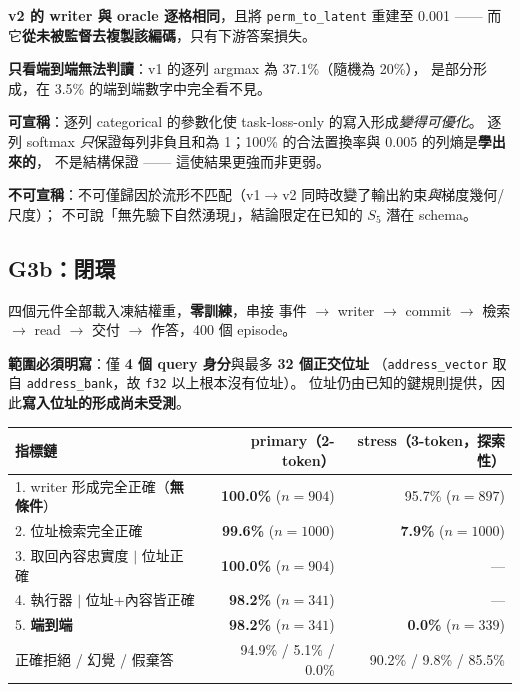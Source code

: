 \documentclass[11pt, a4paper]{article}
\begin{document}
\textbf{v2 的 writer 與 oracle 逐格相同}，且將 \verb|perm_to_latent| 重建至 0.001 ——
而它\textbf{從未被監督去複製該編碼}，只有下游答案損失。

\textbf{只看端到端無法判讀}：v1 的逐列 argmax 為 37.1\%（隨機為 20\%），
是部分形成，在 3.5\% 的端到端數字中完全看不見。

\textbf{可宣稱}：逐列 categorical 的參數化使 task-loss-only 的寫入形成\emph{變得可優化}。
逐列 softmax \emph{只}保證每列非負且和為 1；100\% 的合法置換率與 0.005 的列熵是\textbf{學出來的}，
不是結構保證 —— 這使結果更強而非更弱。

\textbf{不可宣稱}：不可僅歸因於流形不匹配（v1$\to$v2 同時改變了輸出約束\emph{與}梯度幾何/尺度）；
不可說「無先驗下自然湧現」，結論限定在已知的 $S_5$ 潛在 schema。

\subsection{G3b：閉環}

四個元件全部載入凍結權重，\textbf{零訓練}，串接
事件 $\to$ writer $\to$ commit $\to$ 檢索 $\to$ read $\to$ 交付 $\to$ 作答，400 個 episode。

\textbf{範圍必須明寫}：僅 \textbf{4 個 query 身分}與最多 \textbf{32 個正交位址}
（\verb|address_vector| 取自 \verb|address_bank|，故 \verb|f32| 以上根本沒有位址）。
位址仍由已知的鍵規則提供，因此\textbf{寫入位址的形成尚未受測}。

\begin{table}[h]
\centering
\small
\begin{tabular}{lrr}
\toprule
指標鏈 & primary（2-token）& stress（3-token，探索性）\\
\midrule
1. writer 形成完全正確（\textbf{無條件}）& \textbf{100.0\%} ($n{=}904$) & 95.7\% ($n{=}897$) \\
2. 位址檢索完全正確 & \textbf{99.6\%} ($n{=}1000$) & \textbf{7.9\%} ($n{=}1000$) \\
3. 取回內容忠實度 $\mid$ 位址正確 & \textbf{100.0\%} ($n{=}904$) & --- \\
4. 執行器 $\mid$ 位址+內容皆正確 & \textbf{98.2\%} ($n{=}341$) & --- \\
5. \textbf{端到端} & \textbf{98.2\%} ($n{=}341$) & \textbf{0.0\%} ($n{=}339$) \\
正確拒絕 / 幻覺 / 假棄答 & 94.9\% / 5.1\% / 0.0\% & 90.2\% / 9.8\% / 85.5\% \\
\bottomrule
\end{tabular}
\end{table}
\end{document}
